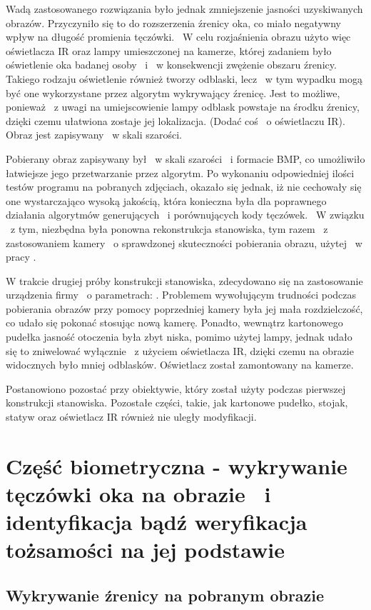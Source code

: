 Wadą zastosowanego rozwiązania było jednak zmniejszenie jasności uzyskiwanych obrazów. Przyczyniło się to do rozszerzenia źrenicy oka, co miało negatywny wpływ na długość promienia tęczówki. ~W celu rozjaśnienia obrazu użyto więc oświetlacza IR oraz lampy umieszczonej na kamerze, której zadaniem było oświetlenie oka badanej osoby ~i ~w konsekwencji zwężenie obszaru źrenicy. Takiego rodzaju oświetlenie również tworzy odblaski, lecz ~w tym wypadku mogą być one wykorzystane przez algorytm wykrywający źrenicę. Jest to możliwe, ponieważ ~z uwagi na umiejscowienie lampy odblask powstaje na środku źrenicy, dzięki czemu ułatwiona zostaje jej lokalizacja. (Dodać coś ~o oświetlaczu IR). Obraz jest zapisywany ~w skali szarości.

Pobierany obraz zapisywany był ~w skali szarości ~i formacie BMP, co umożliwiło łatwiejsze jego przetwarzanie przez algorytm. Po wykonaniu odpowiedniej ilości testów programu na pobranych zdjęciach, okazało się jednak, iż nie cechowały się one wystarczająco wysoką jakością, która konieczna była dla poprawnego działania algorytmów generujących ~i porównujących kody tęczówek. ~W związku ~z tym, niezbędna była ponowna rekonstrukcja stanowiska, tym razem ~z zastosowaniem kamery ~o sprawdzonej skuteczności pobierania obrazu, użytej ~w pracy \cite{Gl11}.

W trakcie drugiej próby konstrukcji stanowiska, zdecydowano się na zastosowanie urządzenia firmy ~o parametrach: . Problemem wywołującym trudności podczas pobierania obrazów przy pomocy poprzedniej kamery była jej mała rozdzielczość, co udało się pokonać stosując nową kamerę. Ponadto, wewnątrz kartonowego pudełka jasność otoczenia była zbyt niska, pomimo użytej lampy, jednak udało się to zniwelować wyłącznie ~z użyciem oświetlacza IR, dzięki czemu na obrazie widocznych było mniej odblasków. Oświetlacz został zamontowany na kamerze.

Postanowiono pozostać przy obiektywie, który został użyty podczas pierwszej konstrukcji stanowiska. Pozostałe części, takie, jak kartonowe pudełko, stojak, statyw oraz oświetlacz IR również nie uległy modyfikacji.

\section{Część biometryczna - wykrywanie tęczówki oka na obrazie ~i identyfikacja bądź weryfikacja tożsamości na jej podstawie}
\subsection{Wykrywanie źrenicy na pobranym obrazie}
\label{sec:wykrycieZrenicy}

